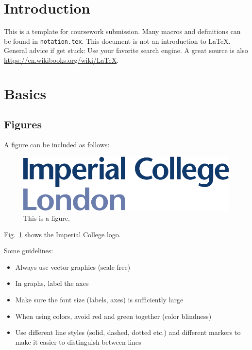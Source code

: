 \documentclass[12pt,twoside]{article}
\begin{document}




\section{Introduction}
This is a template for coursework submission. Many macros and definitions can be found in \texttt{notation.tex}. This document is not an introduction to LaTeX. General advice if get stuck: Use your favorite search engine. A great source is also \mbox{\url{https://en.wikibooks.org/wiki/LaTeX}}.

\section{Basics}

\subsection{Figures}
A figure can be included as follows:
\begin{figure}[tb]
\centering %
\includegraphics[width = 0.7\hsize]{./figures/imperial} %
\caption{This is a figure.} %
\label{fig:imperial figure} %
\end{figure}
Fig.~\ref{fig:imperial figure} shows the Imperial College logo. 

Some guidelines:
\begin{itemize}
\item Always use vector graphics (scale free)
\item In graphs, label the axes
\item Make sure the font size (labels, axes) is sufficiently large
\item When using colors, avoid red and green together (color blindness)
\item Use different line styles (solid, dashed, dotted etc.) and different markers to make it easier to distinguish between lines
\end{itemize}
\end{document}
